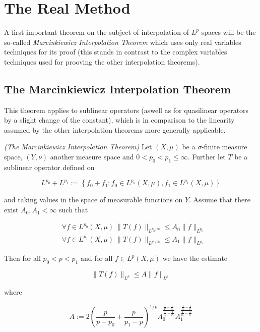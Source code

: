 \section{The Real Method}
A first important theorem on the subject of interpolation of $L^p$ spaces will be the so-called \emph{Marcinkiewicz Interpolation Theorem} which uses only real variables techniques for its proof (this stands in contrast to the complex variables techniques used for prooving the other interpolation theorems).

\subsection{The Marcinkiewicz Interpolation Theorem}
This theorem applies to sublinear operators (aswell as for quasilinear operators by a slight change of the constant), which is in comparison to the linearity assumed by the other interpolation theorems more generally applicable.

\vspace{2mm}

\begin{mdframed}
	\begin{theorem}\emph{(The Marcinkiewicz Interpolation Theorem)}
		Let $(X,\mu)$ be a $\sigma$-finite measure space, $(Y,\nu)$ another measure space and $0 < p_0 < p_1 \leqslant \infty$. Further let $T$ be a sublinear operator defined on
		
		\begin{equation*}
			L^{p_0} + L^{p_1} := \left\{ f_0 + f_1 : f_0 \in L^{p_0}(X,\mu), f_1 \in L^{p_1}(X,\mu) \right\}
		\end{equation*}
		
		and taking values in the space of measurable functions on $Y$. Assume that there exist $A_0,A_1 < \infty$ such that

		\begin{align}
			&\forall f \in L^{p_0}(X,\mu)~\|T(f)\|_{L^{p_0,\infty}} \leqslant A_0 \|f\|_{L^{p_0}}\label{hyp:fp_0}\\
			&\forall f \in L^{p_1}(X,\mu)~\|T(f)\|_{L^{p_1,\infty}} \leqslant A_1 \|f\|_{L^{p_1}}\label{hyp:fp_1}
		\end{align}

		Then for all $p_0 < p < p_1$ and for all $f \in L^p(X,\mu)$ we have the estimate

		\begin{equation}
			\|T(f)\|_{L^p} \leqslant A \|f\|_{L^p}
		\end{equation}

		where

		\begin{equation}
			A := 2\left( \frac{p}{p - p_0} + \frac{p}{p_1 - p} \right)^{1/p}A_0^{\frac{\frac{1}{p} - \frac{1}{p_1}}{\frac{1}{p_0}-\frac{1}{p_1}}}A_1^{\frac{\frac{1}{p_0}-\frac{1}{p}}{\frac{1}{p_0}-\frac{1}{p_1}}}
			\label{eq:constant}
		\end{equation}
	\end{theorem}
\end{mdframed}

